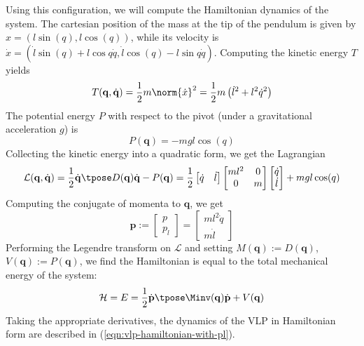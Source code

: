 Using this configuration, we will compute the Hamiltonian dynamics of the system.
The cartesian position of the mass at the tip of the pendulum
is given by \(x = (l\sin(q),l\cos(q))\), while its velocity is
\(\dot{x} = (\dot{l}\sin(q) + l\cos{q}\dot{q}, \dot{l}\cos(q) - l\sin{q}\dot{q})\).
Computing the kinetic energy \(T\) yields
\[
   T(\mathbf{q},\dot{\mathbf{q}}) = 
   \frac{1}{2}m\norm{\dot{x}}^2 = \frac{1}{2}m\left(\dot{l}^2 + l^2\dot{q}^2\right)
\]
The potential energy \(P\) with respect to the pivot (under a gravitational
acceleration \(g\)) is
\[
   P(\mathbf{q}) = -mgl\cos(q)
\]
Collecting the kinetic energy into a quadratic form, we get the Lagrangian
\[
   \mathcal{L}(\mathbf{q},\dot{\mathbf{q}}) 
   = \frac{1}{2} \dot{\mathbf{q}}\tpose D(\mathbf{q})\dot{\mathbf{q}} - P(\mathbf{q})
   = \frac{1}{2}
   \begin{bmatrix} \dot{q} & \dot{l} \end{bmatrix}
   \begin{bmatrix}
      ml^2 & 0 \\
      0 & m \\
   \end{bmatrix}
   \begin{bmatrix} 
      \dot{q} \\ \dot{l}
   \end{bmatrix}
   + mgl\cos(q)
\]
Computing the conjugate of momenta to \(\mathbf{q}\), we get 
\[
   \mathbf{p} := \begin{bmatrix} p \\ p_l \end{bmatrix} 
   = \begin{bmatrix} ml^2\dot{q} \\ m\dot{l} \end{bmatrix} 
\]
Performing the Legendre transform on \(\mathcal{L}\) and setting
\(M(\mathbf{q}) := D(\mathbf{q})\), \(V(\mathbf{q}) := P(\mathbf{q})\),
we find the Hamiltonian is equal to the total mechanical energy of the system:
\[
   \mathcal{H} = E = \frac{1}{2}\dot{\mathbf{p}}\tpose \Minv(\mathbf{q})
   \dot{\mathbf{p}}+V(\mathbf{q})
\]
Taking the appropriate derivatives, the dynamics of the VLP in Hamiltonian form
are described in (\ref{eqn:vlp-hamiltonian-with-pl}). 
